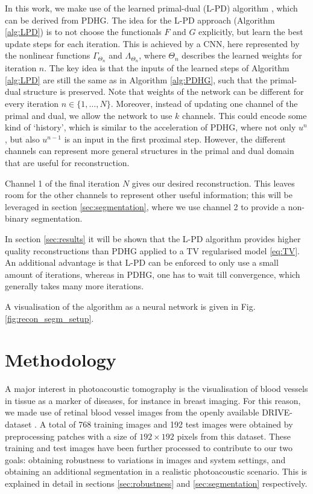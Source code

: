 \documentclass[journal]{IEEEtran}
\newcommand{\hl}[1]{\cbcolor{red}\begin{changebar}{#1}\end{changebar}}
\begin{document}
In this work, we make use of the learned primal-dual (L-PD) algorithm \cite{Adler2018}, which can be derived from PDHG. The idea for the L-PD approach (Algorithm \ref{alg:LPD}) is to not choose the functionals $F$ and $G$ explicitly, but learn the best update steps for each iteration. This is achieved by a CNN, here represented by the nonlinear functions $\Gamma_{\Theta_n}$ and $\Lambda_{\Theta_n}$, where $\Theta_n$ describes the learned weights for iteration $n$. The key idea is that the inputs of the learned steps of Algorithm \ref{alg:LPD} are still the same as in Algorithm \ref{alg:PDHG}, such that the primal-dual structure is preserved. Note that weights of the network can be different for every iteration $n\in\{1,\dots,N\}$. Moreover, instead of updating one channel of the primal and dual, we allow the network to use $k$ channels. This could encode some kind of `history', which is similar to the acceleration of PDHG, where not only $u^n$, but also $u^{n-1}$ is an input in the first proximal step. However, the different channels can represent more general structures in the primal and dual domain that are useful for reconstruction. \hl{Channel 1 of the final iteration $N$ gives our desired reconstruction. This leaves room for the other channels to represent other useful information; this will be leveraged in section \ref{sec:segmentation}, where we use channel 2 to provide a non-binary segmentation.} In section \ref{sec:results} it will be shown that the L-PD algorithm provides higher quality reconstructions than PDHG applied to a TV regularised model \eqref{eq:TV}. An additional advantage is that L-PD can be enforced to only use a small amount of iterations, whereas in PDHG, one has to wait till convergence, which generally takes many more iterations. \hl{A visualisation of the algorithm as a neural network is given in Fig. \ref{fig:recon_segm_setup}.}

\section{Methodology}\label{sec:experiments}
A major interest in photoacoustic tomography is the visualisation of blood vessels in tissue as a marker of diseases, for instance in breast imaging. For this reason, we made use of retinal blood vessel images from the openly available DRIVE-dataset \cite{Staal2004}. A total of 768 training images and 192 test images were obtained by preprocessing patches with a size of $192\times192$ pixels from this dataset. These training and test images have been further processed to contribute to our two goals: obtaining robustness to variations in images and system settings, and obtaining an additional segmentation in a realistic photoacoustic scenario. This is explained in detail in sections \ref{sec:robustness} and \ref{sec:segmentation} respectively.
\end{document}
